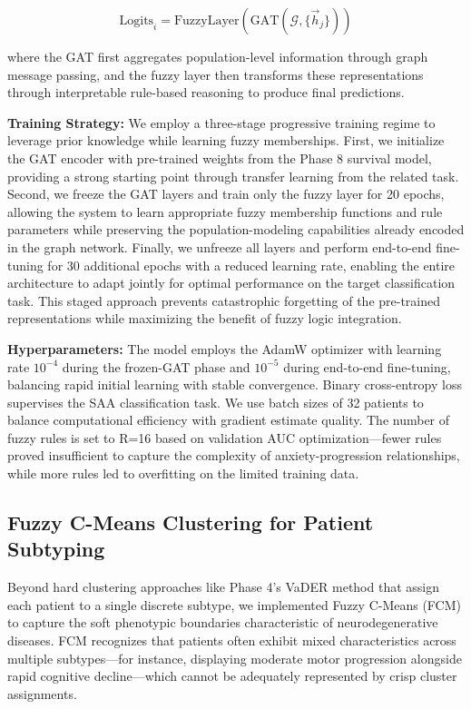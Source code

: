 \documentclass[conference]{IEEEtran}
\begin{document}
\begin{equation}
\text{Logits}_i = \text{FuzzyLayer}(\text{GAT}(\mathcal{G}, \{\vec{h}_j\}))
\end{equation}

where the GAT first aggregates population-level information through graph message passing, and the fuzzy layer then transforms these representations through interpretable rule-based reasoning to produce final predictions.

\textbf{Training Strategy:} We employ a three-stage progressive training regime to leverage prior knowledge while learning fuzzy memberships. First, we initialize the GAT encoder with pre-trained weights from the Phase 8 survival model, providing a strong starting point through transfer learning from the related task. Second, we freeze the GAT layers and train only the fuzzy layer for 20 epochs, allowing the system to learn appropriate fuzzy membership functions and rule parameters while preserving the population-modeling capabilities already encoded in the graph network. Finally, we unfreeze all layers and perform end-to-end fine-tuning for 30 additional epochs with a reduced learning rate, enabling the entire architecture to adapt jointly for optimal performance on the target classification task. This staged approach prevents catastrophic forgetting of the pre-trained representations while maximizing the benefit of fuzzy logic integration.

\textbf{Hyperparameters:} The model employs the AdamW optimizer with learning rate $10^{-4}$ during the frozen-GAT phase and $10^{-5}$ during end-to-end fine-tuning, balancing rapid initial learning with stable convergence. Binary cross-entropy loss supervises the SAA classification task. We use batch sizes of 32 patients to balance computational efficiency with gradient estimate quality. The number of fuzzy rules is set to R=16 based on validation AUC optimization—fewer rules proved insufficient to capture the complexity of anxiety-progression relationships, while more rules led to overfitting on the limited training data.

\subsection{Fuzzy C-Means Clustering for Patient Subtyping}

Beyond hard clustering approaches like Phase 4's VaDER method that assign each patient to a single discrete subtype, we implemented Fuzzy C-Means (FCM) \cite{bezdek1981pattern} to capture the soft phenotypic boundaries characteristic of neurodegenerative diseases. FCM recognizes that patients often exhibit mixed characteristics across multiple subtypes—for instance, displaying moderate motor progression alongside rapid cognitive decline—which cannot be adequately represented by crisp cluster assignments.
\end{document}
